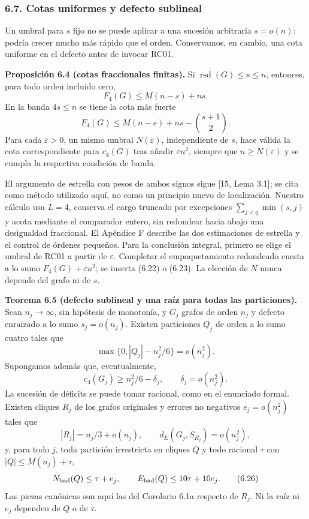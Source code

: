 \documentclass[spanish,11pt,a4paper]{article}
\begin{document}
\subsubsection{6.7. Cotas uniformes y defecto sublineal}\label{cotas-uniformes-y-defecto-sublineal}

Un umbral para \(s\) fijo no se puede aplicar a una sucesión arbitraria \(s=o(n)\): podría crecer mucho más rápido que el orden. Conservamos, en cambio, una cota uniforme en el defecto antes de invocar RC01.


\textbf{Proposición 6.4 (cotas fraccionales finitas).} Si \(\operatorname{rsd}(G)\le s\le n\), entonces, para todo orden incluido cero, \[
F_4(G)\le M(n-s)+ns.
\tag{6.22}
\] En la banda \(4s\le n\) se tiene la cota más fuerte \[
F_4(G)\le M(n-s)+ns-\binom{s+1}{2}.
\tag{6.23}
\] Para cada \(\varepsilon>0\), un mismo umbral \(N(\varepsilon)\), independiente de \(s\), hace válida la cota correspondiente para \(c_4(G)\) tras añadir \(\varepsilon n^2\), siempre que \(n\ge N(\varepsilon)\) y se cumpla la respectiva condición de banda.

El argumento de estrella con pesos de ambos signos sigue {[}15, Lema 3.1{]}; se cita como método utilizado aquí, no como un principio nuevo de localización. Nuestro cálculo usa \(L=4\), conserva el cargo truncado por excepciones \(\sum_{j<q}\min(s,j)\) y acota mediante el comparador entero, sin redondear hacia abajo una desigualdad fraccional. El Apéndice F describe las dos estimaciones de estrella y el control de órdenes pequeños. Para la conclusión integral, primero se elige el umbral de RC01 a partir de \(\varepsilon\). Completar el empaquetamiento redondeado cuesta a lo sumo \(F_4(G)+\varepsilon n^2\); se inserta (6.22) o (6.23). La elección de \(N\) nunca depende del grafo ni de \(s\).


\textbf{Teorema 6.5 (defecto sublineal y una raíz para todas las particiones).} Sean \(n_j\to\infty\), sin hipótesis de monotonía, y \(G_j\) grafos de orden \(n_j\) y defecto enraizado a lo sumo \(s_j=o(n_j)\). Existen particiones \(Q_j\) de orden a lo sumo cuatro tales que \[
\max\{0,|Q_j|-n_j^2/6\}=o(n_j^2).
\tag{6.24}
\] Supongamos además que, eventualmente, \[
c_4(G_j)\ge n_j^2/6-\delta_j,\qquad \delta_j=o(n_j^2).
\] La sucesión de déficits se puede tomar racional, como en el enunciado formal. Existen cliques \(R_j\) de los grafos originales y errores no negativos \(e_j=o(n_j^2)\) tales que \[
|R_j|=n_j/3+o(n_j),\qquad
d_E(G_j,S_{R_j})=o(n_j^2),
\tag{6.25}
\] y, para todo \(j\), toda partición irrestricta en cliques \(Q\) y todo racional \(\tau\) con \(|Q|\le M(n_j)+\tau\), \[
N_{\rm bad}(Q)\le\tau+e_j,\qquad
E_{\rm bad}(Q)\le10\tau+10e_j.
\tag{6.26}
\] Las piezas canónicas son aquí las del Corolario 6.1a respecto de \(R_j\). Ni la raíz ni \(e_j\) dependen de \(Q\) o de \(\tau\).
\end{document}
